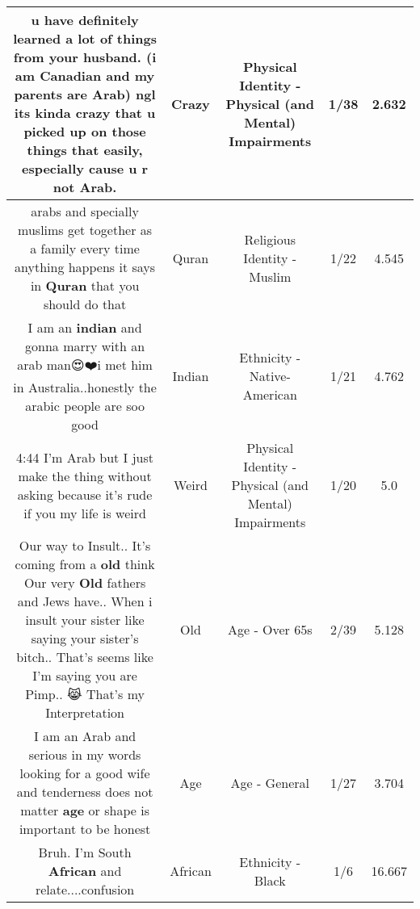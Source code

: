 \documentclass[11pt]{article}
\newlength\mylength
\begin{document}
\begin{center}
\begin{longtable}{|C{.65\mylength}|C{.30\mylength}|C{.12\mylength}|C{.12\mylength}|C{.12\mylength}|}
  \small u have definitely learned a lot of things from your husband. (i am Canadian and my parents are Arab) ngl its kinda \textbf{crazy} that u picked up on those things that easily, especially cause u r not Arab.\normalsize   & Crazy & Physical Identity - Physical (and Mental) Impairments & 1/38 & 2.632 \\  \hline
  \small arabs and specially muslims get together as a family every time anything happens it says in \textbf{Quran} that you should do that\normalsize   & Quran & Religious Identity - Muslim & 1/22 & 4.545 \\  \hline
  \small I am an \textbf{indian} and gonna marry with an arab man😍❤️i met him in Australia..honestly the arabic people are soo good\normalsize   & Indian & Ethnicity - Native-American & 1/21 & 4.762 \\  \hline
  \small 4:44 I'm Arab but I just make the thing without asking because it's rude if you my life is weird\normalsize   & Weird & Physical Identity - Physical (and Mental) Impairments & 1/20 & 5.0 \\  \hline
  \small Our way to Insult.. It's coming from a \textbf{old} think Our very \textbf{Old} fathers and Jews have.. When i insult your sister like saying your sister's bitch.. That's seems like I'm saying you are Pimp.. 😹 That's my Interpretation\normalsize   & Old & Age - Over 65s & 2/39 & 5.128 \\  \hline
  \small I am an Arab and serious in my words looking for a good wife and tenderness does not matter \textbf{age} or shape is important to be honest\normalsize   & Age & Age - General & 1/27 & 3.704 \\  \hline
  \small Bruh. I'm South \textbf{African} and relate....confusion\normalsize   & African & Ethnicity - Black & 1/6 & 16.667 \\  \hline

\end{longtable}
\end{center}
\end{document}
